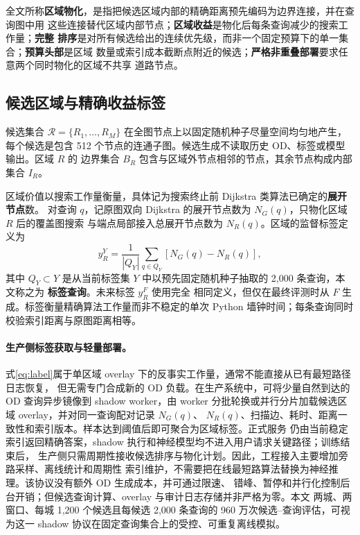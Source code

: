 \documentclass[UTF8,a4paper,10pt,twocolumn]{ctexart}
\begin{document}
全文所称\textbf{区域物化}，是指把候选区域内部的精确距离预先编码为边界连接，并在查询图中用
这些连接替代区域内部节点；\textbf{区域收益}是物化后每条查询减少的搜索工作量；\textbf{完整
排序}是对所有候选给出的连续优先级，而非一个固定预算下的单一集合；\textbf{预算头部}是区域
数量或索引成本截断点附近的候选；\textbf{严格非重叠部署}要求任意两个同时物化的区域不共享
道路节点。

\subsection{候选区域与精确收益标签}

候选集合 $\mathcal{R}=\{R_1,\ldots,R_M\}$ 在全图节点上以固定随机种子尽量空间均匀地产生，
每个候选是包含 512 个节点的连通子图。候选生成不读取历史 OD、标签或模型输出。区域 $R$ 的
边界集合 $B_R$ 包含与区域外节点相邻的节点，其余节点构成内部集合 $I_R$。

区域价值以搜索工作量衡量，具体记为搜索终止前 Dijkstra 类算法已确定的\textbf{展开节点}数。
对查询 $q$，记原图双向 Dijkstra 的展开节点数为 $N_G(q)$，只物化区域 $R$ 后的覆盖图搜索
与端点局部接入总展开节点数为 $N_R(q)$。区域的监督标签定义为
\begin{equation}
  y_R^{Y}=\frac{1}{|Q_Y|}\sum_{q\in Q_Y}\left[N_G(q)-N_R(q)\right],
  \label{eq:label}
\end{equation}
其中 $Q_Y\subset Y$ 是从当前标签集 $Y$ 中以预先固定随机种子抽取的 2,000 条查询，本文称之为
\textbf{标签查询}。未来标签 $y_R^F$ 使用完全
相同定义，但仅在最终评测时从 $F$ 生成。标签衡量精确算法工作量而非不稳定的单次 Python
墙钟时间；每条查询同时校验索引距离与原图距离相等。

\paragraph{生产侧标签获取与轻量部署。}
式\eqref{eq:label}属于单区域 overlay 下的反事实工作量，通常不能直接从已有最短路径日志恢复，
但无需专门合成新的 OD 负载。在生产系统中，可将少量自然到达的 OD 查询异步镜像到 shadow
worker，由 worker 分批轮换或并行分片加载候选区域 overlay，并对同一查询配对记录 $N_G(q)$、
$N_R(q)$、扫描边、耗时、距离一致性和索引版本。样本达到阈值后即可聚合为区域标签。正式服务
仍由当前稳定索引返回精确答案，shadow 执行和神经模型均不进入用户请求关键路径；训练结束后，
生产侧只需周期性接收候选排序与物化计划。因此，工程接入主要增加旁路采样、离线统计和周期性
索引维护，不需要把在线最短路算法替换为神经推理。该协议没有额外 OD 生成成本，并可通过限速、
错峰、暂停和并行化控制后台开销；但候选查询计算、overlay 与审计日志存储并非严格为零。本文
两城、两窗口、每城 1,200 个候选且每候选 2,000 条查询的 960 万次候选--查询评估，可视为这一
shadow 协议在固定查询集合上的受控、可重复离线模拟。
\end{document}
